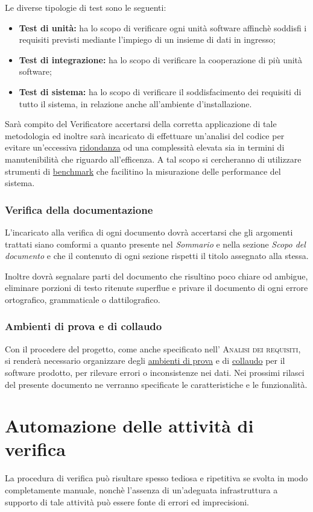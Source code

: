 \documentclass[11pt,a4paper]{article}
\begin{document}
Le diverse tipologie di test sono le seguenti:
\begin{itemize}
	\item \textbf{Test di unità:} ha lo scopo di verificare ogni unità software affinchè soddisfi i requisiti previsti mediante l’impiego di un insieme di dati in ingresso;
	\item \textbf{Test di integrazione:} ha lo scopo di verificare la cooperazione di più unità software;
	\item \textbf{Test di sistema:} ha lo scopo di verificare il soddisfacimento dei requisiti di tutto il sistema, in relazione anche all'ambiente d'installazione.
\end{itemize}
Sarà compito del Verificatore accertarsi della corretta applicazione di tale metodologia ed inoltre sarà incaricato di effettuare un'analisi del codice per evitare un'eccessiva \underline{ridondanza} od una complessità elevata sia in termini di manutenibilità che riguardo all'efficenza. A tal scopo si cercheranno di utilizzare strumenti di \underline{benchmark} che facilitino la misurazione delle performance del sistema.
\subsubsection{Verifica della documentazione}
L'incaricato alla verifica di ogni documento dovrà accertarsi che gli argomenti trattati siano comformi a quanto presente nel \textit{Sommario} e nella sezione \textit{Scopo del documento} e che il contenuto di ogni sezione rispetti il titolo assegnato alla stessa.

Inoltre dovrà segnalare parti del documento che risultino poco chiare od ambigue, eliminare porzioni di testo ritenute superflue e privare il documento di ogni errore ortografico, grammaticale o dattilografico. 
\subsubsection{Ambienti di prova e di collaudo}
Con il procedere del progetto, come anche specificato nell' \textsc{Analisi dei requisiti}, si renderà necessario organizzare degli \underline{ambienti di prova} e di \underline{collaudo} per il software prodotto, per rilevare errori o inconsistenze nei dati. Nei prossimi rilasci del presente documento ne verranno specificate le caratteristiche e le funzionalità.
\section{Automazione delle attività di verifica}
La procedura di verifica può risultare spesso tediosa e ripetitiva se svolta in modo completamente manuale, nonchè l'assenza di un'adeguata infrastruttura a supporto di tale attività può essere fonte di errori ed imprecisioni.
\end{document}

